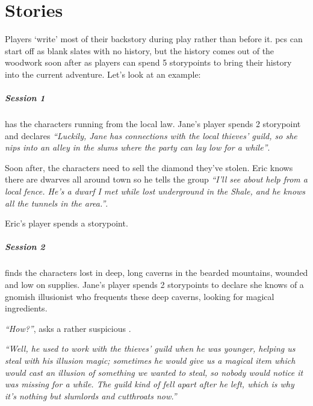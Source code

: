 \chapter{Stories}
\label{stories}


\begin{multicols}{2}

\noindent
Players `write' most of their backstory during play rather than before it.
\Glspl{pc} can start off as blank slates with no history, but the history comes out of the woodwork soon after as players can spend 5 \glspl{storypoint} to bring their history into the current \gls{adventure}.
Let's look at an example:

\paragraph{Session 1} has the characters running from the local law.
Jane's player spends 2 \gls{storypoint} and declares \textit{``Luckily, Jane has connections with the local thieves' guild, so she nips into an alley in the slums where the party can lay low for a while''}.

Soon after, the characters need to sell the diamond they've stolen.
Eric knows there are dwarves all around town so he tells the group \textit{``I'll see about help from a local fence.
He's a dwarf I met while lost underground in the Shale, and he knows all the tunnels in the area.''}.

Eric's player spends a \gls{storypoint}.

\paragraph{Session 2} finds the characters lost in deep, long caverns in the bearded mountains, wounded and low on supplies.
Jane's player spends 2 \glspl{storypoint} to declare she knows of a gnomish illusionist who frequents these deep caverns, looking for magical ingredients.

\textit{``How?''}, asks a rather suspicious .

\textit{``Well, he used to work with the thieves' guild when he was younger, helping us steal with his illusion magic; sometimes he would give us a magical item which would cast an illusion of something we wanted to steal, so nobody would notice it was missing for a while.
The guild kind of fell apart after he left, which is why it's nothing but slumlords and cutthroats now.''}


\end{multicols}

